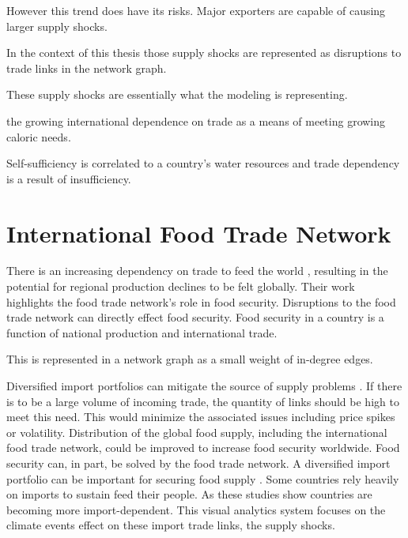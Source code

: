 However this trend does have its risks. Major exporters are capable of causing larger supply shocks. 





In the context of this thesis those supply shocks are represented as disruptions to trade links in the network graph. 

These supply shocks are essentially what the modeling is representing.

\cite{porkka2013food} the growing international dependence on trade as a means of meeting growing caloric needs.



Self-sufficiency is correlated to a country's water resources and trade dependency is a result of insufficiency. 







\section{International Food Trade Network}
There is an increasing dependency on trade to feed the world \citep{d2014feeding}, resulting in the potential for regional production declines to be felt globally. Their work highlights the food trade network's role in food security. Disruptions to the food trade network can directly effect food security. Food security in a country is a function of national production and international trade.\par

This is represented in a network graph as a small weight of in-degree edges.

Diversified import portfolios can mitigate the source of supply problems \citep{silberglitt2015critical}. If there is to be a large volume of incoming trade, the quantity of links should be high to meet this need. This would minimize the associated issues including price spikes or volatility.   Distribution of the global food supply, including the international food trade network, could be improved to increase food security worldwide. Food security can, in part, be solved by the food trade network. A diversified import portfolio can be important for securing food supply \citep{fader2013spatial}. Some countries rely heavily on imports to sustain feed their people.    As these studies show countries are becoming more import-dependent. This visual analytics system focuses on the climate events effect on these import trade links, the supply shocks.\par




